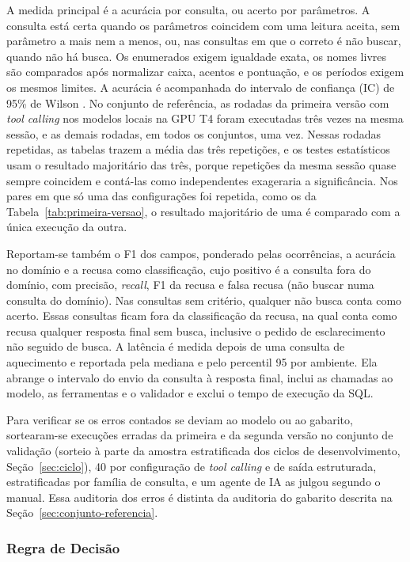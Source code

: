 A medida principal é a acurácia por consulta, ou acerto por parâmetros. A consulta está certa quando os parâmetros coincidem com uma leitura aceita, sem parâmetro a mais nem a menos, ou, nas consultas em que o correto é não buscar, quando não há busca. Os enumerados exigem igualdade exata, os nomes livres são comparados após normalizar caixa, acentos e pontuação, e os períodos exigem os mesmos limites. A acurácia é acompanhada do intervalo de confiança (IC) de 95\% de Wilson \cite{wilson1927probable}. No conjunto de referência, as rodadas da primeira versão com \textit{tool calling} nos modelos locais na GPU T4 foram executadas três vezes na mesma sessão, e as demais rodadas, em todos os conjuntos, uma vez. Nessas rodadas repetidas, as tabelas trazem a média das três repetições, e os testes estatísticos usam o resultado majoritário das três, porque repetições da mesma sessão quase sempre coincidem e contá-las como independentes exageraria a significância. Nos pares em que só uma das configurações foi repetida, como os da Tabela~\ref{tab:primeira-versao}, o resultado majoritário de uma é comparado com a única execução da outra.

Reportam-se também o F1 dos campos, ponderado pelas ocorrências, a acurácia no domínio e a recusa como classificação, cujo positivo é a consulta fora do domínio, com precisão, \textit{recall}, F1 da recusa e falsa recusa (não buscar numa consulta do domínio). Nas consultas sem critério, qualquer não busca conta como acerto. Essas consultas ficam fora da classificação da recusa, na qual conta como recusa qualquer resposta final sem busca, inclusive o pedido de esclarecimento não seguido de busca. A latência é medida depois de uma consulta de aquecimento e reportada pela mediana e pelo percentil 95 por ambiente. Ela abrange o intervalo do envio da consulta à resposta final, inclui as chamadas ao modelo, as ferramentas e o validador e exclui o tempo de execução da SQL.

Para verificar se os erros contados se deviam ao modelo ou ao gabarito, sortearam-se  execuções erradas da primeira e da segunda versão no conjunto de validação (sorteio à parte da amostra estratificada dos ciclos de desenvolvimento, Seção~\ref{sec:ciclo}), 40 por configuração de \textit{tool calling} e de saída estruturada, estratificadas por família de consulta, e um agente de IA as julgou segundo o manual. Essa auditoria dos erros é distinta da auditoria do gabarito descrita na Seção~\ref{sec:conjunto-referencia}.

\subsubsection{Regra de Decisão}
\label{sec:regra-decisao}

